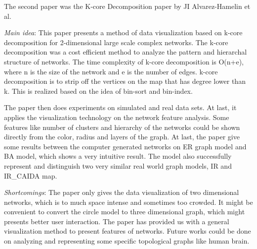The second paper was the K-core Decomposition paper by JI Alvarez-Hamelin et al.
\cite{DBLP:journals/corr/abs-cs-0504107}
\begin{itemize*}
\item {\em Main idea}: 
This paper presents a method of data visualization based on k-core decomposition for 2-dimensional large scale complex networks. The k-core decomposition was a cost efficient method to analyze the pattern and hierarchal structure of networks. The time complexity of k-core decomposition is O(n+e), where n is the size of the network and e is the number of edges. k-core decomposition is to strip off the vertices on the map that has degree lower than k. This is realized based on the idea of bin-sort and bin-index.

The paper then does experiments on simulated and real data sets. At last, it applies the visualization technology on the network feature analysis. Some features like number of clusters and hierarchy of the networks could be shown directly from the color, radius and layers of the graph. At last, the paper give some results between the computer generated networks on ER graph model and BA model, which shows a very intuitive result. The model also successfully represent and distinguish two very similar real world graph models, IR and IR\_CAIDA map.
\item {\em Shortcomings}:
The paper only gives the data visualization of two dimensional networks, which is to much space intense and sometimes too crowded. It might be convenient to convert the circle model to three dimensional graph, which might presents better user interaction. 
The paper has provided us with a general visualization method to present features of networks. Future works could be done on analyzing and representing some specific topological graphs like human brain.
\end{itemize*}

